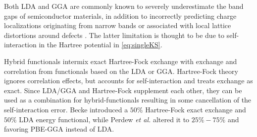 Both LDA and GGA are commonly known to severely underestimate the band gaps of semiconductor materials, in addition to incorrectly predicting charge localizations originating from narrow bands or associated with local lattice distortions around defects \cite{Freysoldt2014}. The latter limitation is thought to be due to self-interaction in the Hartree potential in \autoref{eq:singleKS}.

Hybrid functionals intermix exact Hartree-Fock exchange with exchange and correlation from functionals based on the LDA or GGA.
Hartree-Fock theory ignores correlation effects, but accounts for self-interaction and treats exchange as exact.
Since LDA/GGA and Hartree-Fock supplement each other, they can be used as a combination for hybrid-functionals resulting in some cancellation of the self-interaction error. Becke \cite{Becke1993} introduced a $50\%$ Hartree-Fock exact exchange and
$50\%$ LDA energy functional, while Perdew \textit{et al.} \cite{Perdew1996a} altered it to $25\%-75\%$ and favoring PBE-GGA instead of LDA.

